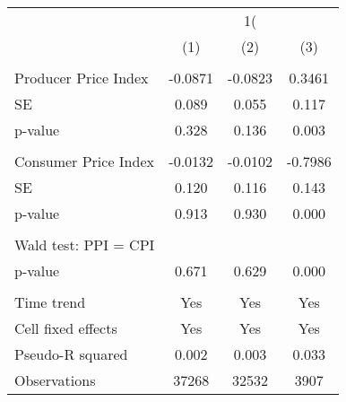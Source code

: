 {
\def\sym#1{\ifmmode^{#1}\else\(^{#1}\)\fi}
\begin{tabular}{l*{3}{c}}
\hline\hline
                    &&&\\\cmidrule(lr){2-2}\cmidrule(lr){3-3}\cmidrule(lr){4-4}
                    &         &         &         \\
\hline
\hline
\\ Producer Price Index&     -0.0871         &     -0.0823         &      0.3461         \\
\hspace{15pt} SE    &       0.089         &       0.055         &       0.117         \\
\hspace{15pt} p-value&       0.328         &       0.136         &       0.003         \\
\\ Consumer Price Index&     -0.0132         &     -0.0102         &     -0.7986         \\
\hspace{15pt} SE    &       0.120         &       0.116         &       0.143         \\
\hspace{15pt} p-value&       0.913         &       0.930         &       0.000         \\
\hline \\  Wald test: PPI = CPI&                     &                     &                     \\
\hspace{15pt} p-value&       0.671         &       0.629         &       0.000         \\
\hline \\ Time trend&         Yes         &         Yes         &         Yes         \\
Cell fixed effects  &         Yes         &         Yes         &         Yes         \\
Pseudo-R squared    &       0.002         &       0.003         &       0.033         \\
Observations        &       37268         &       32532         &        3907         \\
\hline\hline
\end{tabular}
}
